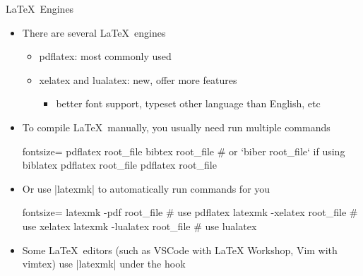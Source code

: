 \begin{frame}[fragile]{\LaTeX~Engines}
  \begin{itemize}
    \item There are several \LaTeX~engines
          \begin{itemize}
            \item \alert{pdflatex}: most commonly used
            \item \alert{xelatex} and \alert{lualatex}: new, offer more features
                  \begin{itemize}
                    \item better font support, typeset other language than English, etc
                  \end{itemize}
          \end{itemize}
    \item To compile \LaTeX~manually, you usually need run multiple commands
          \begin{bashcode*}{fontsize=\scriptsize}
            pdflatex root_file
            bibtex root_file # or `biber root_file` if using biblatex
            pdflatex root_file
            pdflatex root_file
          \end{bashcode*}
    \item Or use \bashinline|latexmk| to automatically run commands for you
          \begin{bashcode*}{fontsize=\scriptsize}
            latexmk -pdf root_file # use pdflatex
            latexmk -xelatex root_file # use xelatex
            latexmk -lualatex root_file # use lualatex
          \end{bashcode*}
    \item Some \LaTeX~editors (such as VSCode with LaTeX Workshop, Vim with vimtex) use \bashinline|latexmk| under the hook
  \end{itemize}
\end{frame}

